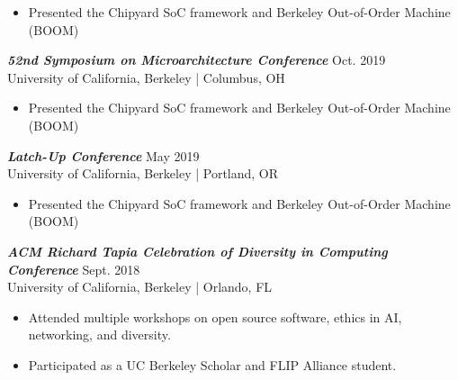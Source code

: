 \documentclass[letter]{res}
\begin{document}
\begin{resume}
 \vspace{-4mm}

 \begin{itemize}
 \item Presented the Chipyard SoC framework and Berkeley Out-of-Order Machine (BOOM)
 \end{itemize}

\vspace{-2mm}

{\sl \textbf{52nd Symposium on Microarchitecture Conference}} \hfill Oct. 2019\\
 University of California, Berkeley | Columbus, OH \newline

 \vspace{-4mm}

 \begin{itemize}
 \item Presented the Chipyard SoC framework and Berkeley Out-of-Order Machine (BOOM)
 \end{itemize}

\vspace{-2mm}



{\sl \textbf{Latch-Up Conference}} \hfill May 2019\\
 University of California, Berkeley | Portland, OR \newline

 \vspace{-4mm}

 \begin{itemize}
 \item Presented the Chipyard SoC framework and Berkeley Out-of-Order Machine (BOOM)
 \end{itemize}

\vspace{-2mm}

{\sl \textbf{ACM Richard Tapia Celebration of Diversity in Computing Conference}} \hfill Sept. 2018\\
 University of California, Berkeley | Orlando, FL \newline

 \vspace{-4mm}

 \begin{itemize}
 \item Attended multiple workshops on open source software, ethics in AI, networking, and diversity.
 \item Participated as a UC Berkeley Scholar and FLIP Alliance student.
 \end{itemize}


\end{resume}
\end{document}
